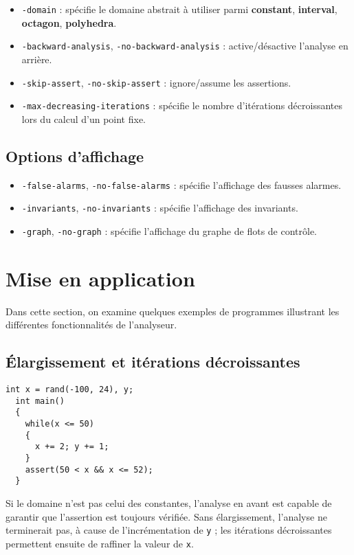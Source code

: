 \documentclass{article}
\begin{document}
\begin{itemize}
\item \verb|-domain| : spécifie le domaine abstrait à utiliser parmi
  \textbf{constant}, \textbf{interval}, \textbf{octagon},
  \textbf{polyhedra}.
\item \verb|-backward-analysis|, \verb|-no-backward-analysis| :
  active/désactive l'analyse en arrière.
\item \verb|-skip-assert|, \verb|-no-skip-assert| : ignore/assume les
  assertions.
\item \verb|-max-decreasing-iterations| : spécifie le nombre
  d'itérations décroissantes lors du calcul d'un point fixe.
\end{itemize}

\subsection{Options d'affichage}
\begin{itemize}
\item \verb|-false-alarms|, \verb|-no-false-alarms| : spécifie
  l'affichage des fausses alarmes.
\item \verb|-invariants|, \verb|-no-invariants| : spécifie l'affichage
  des invariants.
\item \verb|-graph|, \verb|-no-graph| : spécifie l'affichage du graphe
  de flots de contrôle.
\end{itemize}

\section{Mise en application}

Dans cette section, on examine quelques exemples de programmes
illustrant les différentes fonctionnalités de l'analyseur.

\subsection{Élargissement et itérations décroissantes}

\begin{lstlisting}[frame=single]
  int x = rand(-100, 24), y;
  int main()
  {
    while(x <= 50)
    {
      x += 2; y += 1;
    }
    assert(50 < x && x <= 52);
  }
\end{lstlisting}

Si le domaine n'est pas celui des constantes, l'analyse en avant est
capable de garantir que l'assertion est toujours vérifiée.
Sans élargissement, l'analyse ne terminerait pas, à cause de
l'incrémentation de \verb|y| ; les itérations décroissantes permettent
ensuite de raffiner la valeur de \verb|x|.
\end{document}
